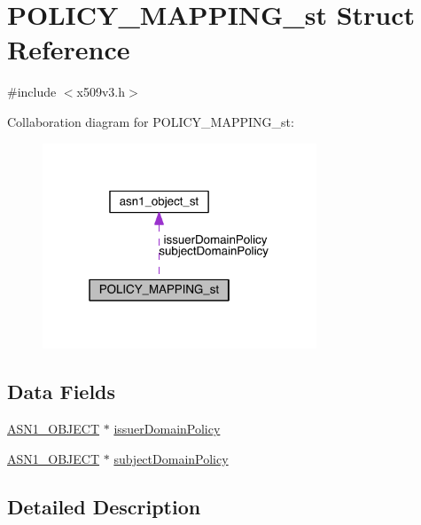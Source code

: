 \hypertarget{struct_p_o_l_i_c_y___m_a_p_p_i_n_g__st}{}\section{P\+O\+L\+I\+C\+Y\+\_\+\+M\+A\+P\+P\+I\+N\+G\+\_\+st Struct Reference}
\label{struct_p_o_l_i_c_y___m_a_p_p_i_n_g__st}


{\ttfamily \#include $<$x509v3.\+h$>$}



Collaboration diagram for P\+O\+L\+I\+C\+Y\+\_\+\+M\+A\+P\+P\+I\+N\+G\+\_\+st\+:\nopagebreak
\begin{figure}[H]
\begin{center}
\leavevmode
\includegraphics[width=232pt]{struct_p_o_l_i_c_y___m_a_p_p_i_n_g__st__coll__graph}
\end{center}
\end{figure}
\subsection*{Data Fields}
\begin{DoxyCompactItemize}
\item 
\hyperlink{crypto_2ossl__typ_8h_ae3fda0801e4c8e250087052bafb3ce2e}{A\+S\+N1\+\_\+\+O\+B\+J\+E\+CT} $\ast$ \hyperlink{struct_p_o_l_i_c_y___m_a_p_p_i_n_g__st_a840f03761805c8d6b79c39f644f1f563}{issuer\+Domain\+Policy}
\item 
\hyperlink{crypto_2ossl__typ_8h_ae3fda0801e4c8e250087052bafb3ce2e}{A\+S\+N1\+\_\+\+O\+B\+J\+E\+CT} $\ast$ \hyperlink{struct_p_o_l_i_c_y___m_a_p_p_i_n_g__st_a6dfa36751e3ebb76daab87a3f0968539}{subject\+Domain\+Policy}
\end{DoxyCompactItemize}


\subsection{Detailed Description}


